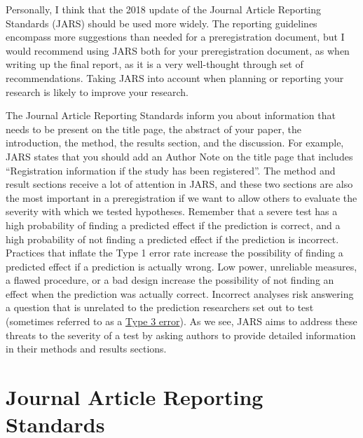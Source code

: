 \documentclass[
  oneside]{book}
\begin{document}
Personally, I think that the 2018 update of the Journal Article Reporting Standards (JARS) \citep{appelbaum_journal_2018} should be used more widely. The reporting guidelines encompass more suggestions than needed for a preregistration document, but I would recommend using JARS both for your preregistration document, as when writing up the final report, as it is a very well-thought through set of recommendations. Taking JARS into account when planning or reporting your research is likely to improve your research.

The Journal Article Reporting Standards inform you about information that needs to be present on the title page, the abstract of your paper, the introduction, the method, the results section, and the discussion. For example, JARS states that you should add an Author Note on the title page that includes ``Registration information if the study has been registered''. The method and result sections receive a lot of attention in JARS, and these two sections are also the most important in a preregistration if we want to allow others to evaluate the severity with which we tested hypotheses. Remember that a severe test has a high probability of finding a predicted effect if the prediction is correct, and a high probability of not finding a predicted effect if the prediction is incorrect. Practices that inflate the Type 1 error rate increase the possibility of finding a predicted effect if a prediction is actually wrong. Low power, unreliable measures, a flawed procedure, or a bad design increase the possibility of not finding an effect when the prediction was actually correct. Incorrect analyses risk answering a question that is unrelated to the prediction researchers set out to test (sometimes referred to as a \href{https://en.wikipedia.org/wiki/Type_III_error\#Kimball}{Type 3 error}). As we see, JARS aims to address these threats to the severity of a test by asking authors to provide detailed information in their methods and results sections.

\hypertarget{journal-article-reporting-standards}{%
\section{Journal Article Reporting Standards}\label{journal-article-reporting-standards}}
\end{document}
